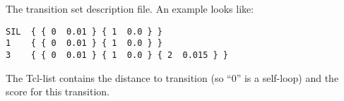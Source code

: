 
\section{}

The transition set description file. An example looks like:

\begin{verbatim}
SIL  { { 0  0.01 } { 1  0.0 } }
1    { { 0  0.01 } { 1  0.0 } }
3    { { 0  0.01 } { 1  0.0 } { 2  0.015 } }
\end{verbatim}

The Tcl-list contains the distance to transition (so ``0'' is a
self-loop) and the score for this transition.

